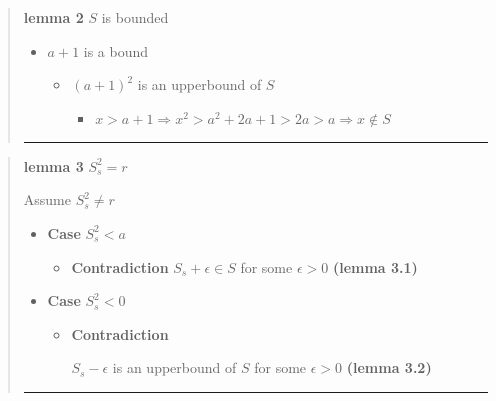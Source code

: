 \documentclass{tufte-book}
\providecommand{\tightlist}{%
  \setlength{\itemsep}{0pt}\setlength{\parskip}{0pt}}
\begin{document}
\begin{quote}
\textbf{lemma 2} \(S\) is bounded

\begin{itemize}
\tightlist
\item
  \(a+1\) is a bound

  \begin{itemize}
  \tightlist
  \item
    \((a + 1)^2\) is an upperbound of \(S\)

    \begin{itemize}
    \tightlist
    \item
      \(x > a+1 \Rightarrow x^2 > a^2 + 2a + 1 > 2a > a \Rightarrow x \nin S\)
    \end{itemize}
  \end{itemize}
\end{itemize}

\begin{center}\rule{0.5\linewidth}{\linethickness}\end{center}
\end{quote}

\begin{quote}
\textbf{lemma 3} \(S_s^2 = r\)

Assume \(S_s^2 \neq r\)

\begin{itemize}
\tightlist
\item
  \textbf{Case} \(S_s^2 < a\)

  \begin{itemize}
  \tightlist
  \item
    \textbf{Contradiction} \(S_s + \epsilon \in S\) for some
    \(\epsilon > 0\) \textbf{(lemma 3.1)}
  \end{itemize}
\item
  \textbf{Case} \(S_s^2 < 0\)

  \begin{itemize}
  \item
    \textbf{Contradiction}

    \(S_s - \epsilon\) is an upperbound of \(S\) for some
    \(\epsilon > 0\) \textbf{(lemma 3.2)}
  \end{itemize}
\end{itemize}

\begin{center}\rule{0.5\linewidth}{\linethickness}\end{center}
\end{quote}
\end{document}
